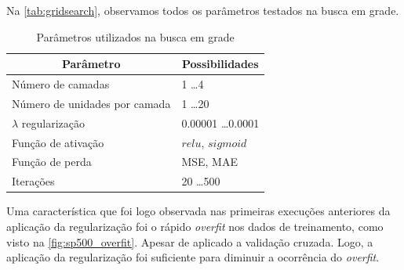 \documentclass[
    12pt,
    oneside,
    a4paper,
    english,
    brazil
]{abntex2}
\begin{document}
Na \autoref{tab:gridsearch},  observamos todos os parâmetros  testados na busca
em grade.

\begin{table}[ht]
\centering
\caption{Parâmetros utilizados na busca em grade}\label{tab:gridsearch}
\begin{tabular}{l l}
\multicolumn{1}{c}{Parâmetro}        & \multicolumn{1}{c}{Possibilidades}  \\
    \toprule
    Número de camadas                & 1 \ldots 4                          \\
    Número de unidades por camada    & 1 \ldots 20                         \\
    $\lambda$ regularização          & 0.00001 \ldots 0.0001               \\
    Função de ativação               & $relu$, $sigmoid$                   \\
    Função de perda                  & MSE, MAE                            \\
    Iterações                        & 20 \ldots 500
\end{tabular}
\end{table}

Uma característica  que foi logo  observada nas primeiras  execuções anteriores
da  aplicação da  regularização  foi  o rápido  \textit{overfit}  nos dados  de
treinamento, como  visto na  \autoref{fig:sp500_overfit}. Apesar de  aplicado a
validação  cruzada. Logo,  a  aplicação da  regularização  foi suficiente  para
diminuir a ocorrência do \textit{overfit}.
\end{document}
